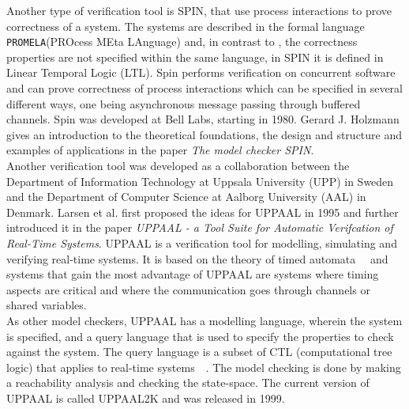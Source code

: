 Another type of verification tool is SPIN\cite{spin}, that use process interactions to prove correctness of a system. The systems are described in the formal language \texttt{PROMELA}(PROcess MEta LAnguage)\cite{Holzmann1991} and, in contrast to \cspm, the correctness properties are not specified within the same language, in SPIN it is defined in Linear Temporal Logic (LTL)\cite{Pnueli1977}.
Spin performs verification on concurrent software and can prove correctness of process interactions which can be specified in several different ways, one being asynchronous message passing through buffered channels.
Spin was developed at Bell Labs, starting in 1980. Gerard J. Holzmann gives an introduction to the theoretical foundations, the design and structure and examples of applications in the paper \textit{The model checker SPIN}\cite{Holzmann1997}. \\
Another verification tool was developed as a collaboration between the Department of Information Technology at Uppsala University (UPP) in Sweden and the Department of Computer Science at Aalborg University (AAL) in Denmark. Larsen et al. first proposed the ideas for UPPAAL\cite{Larsen1995} in 1995 and further introduced it in the paper \textit{UPPAAL - a Tool Suite for Automatic Verifcation of Real-Time Systems}\cite{Bengtsson1995}.
UPPAAL is a verification tool for modelling, simulating and verifying real-time systems. It is based on the theory of timed automata~\cite{Hopcroft2001}~\cite{Alur1990} and systems that gain the most advantage of UPPAAL are systems where timing aspects are critical and where the communication goes through channels or shared variables.\\
As other model checkers, UPPAAL has a modelling language, wherein the system is specified, and a query language that is used to specify the properties to check against the system. The query language is a subset of CTL (computational tree logic) that applies to real-time systems~\cite{Henzinger1994}~\cite{Larsen1995}. The model checking is done by making a reachability analysis and checking the state-space. The current version of UPPAAL is called UPPAAL2K and was released in 1999\cite{Amnell2001}.\\

